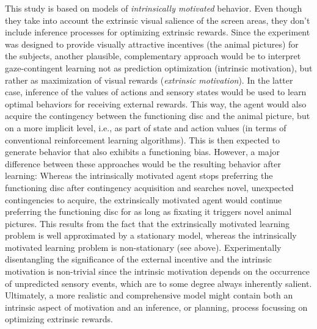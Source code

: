 \documentclass[a4paper]{scrreprt}
\begin{document}
This study is based on models of \textit{intrinsically motivated} behavior. 
Even though they take into account the extrinsic visual salience of the screen areas, they don't include inference processes for optimizing extrinsic rewards. %
Since the experiment was designed to provide visually attractive incentives (the animal pictures) for the subjects, another plausible, complementary approach would be to interpret gaze-contingent learning not as prediction optimization (intrinsic motivation), but rather as maximization of visual rewards (\textit{extrinsic motivation}). In the latter case, inference of the values of actions and sensory states would be used to learn optimal behaviors for receiving external rewards. This way, the agent would also acquire the contingency between the functioning disc and the animal picture, but on a more implicit level, i.e., as part of state and action values (in terms of conventional reinforcement learning algorithms). This is then expected to generate behavior that also exhibits a functioning bias. However, a major difference between these approaches would be the resulting behavior after learning: Whereas the intrinsically motivated agent stops preferring the functioning disc after contingency acquisition and searches novel, unexpected contingencies to acquire, the extrinsically motivated agent would continue preferring the functioning disc for as long as fixating it triggers novel animal pictures. This results from the fact that the extrinsically motivated learning problem is well approximated by a stationary model, whereas the intrinsically motivated learning problem is non-stationary (see above). Experimentally disentangling the significance of the external incentive and the intrinsic motivation is non-trivial since the intrinsic motivation depends on the occurrence of unpredicted sensory events, which are to some degree always inherently salient. Ultimately, a more realistic and comprehensive model might contain both an intrinsic aspect of motivation and an inference, or planning, process focussing on optimizing extrinsic rewards.
\end{document}
